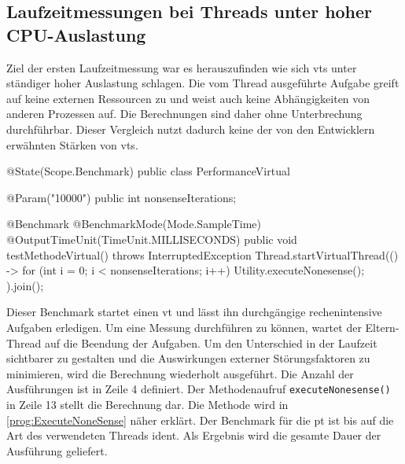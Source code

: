 \subsection{Laufzeitmessungen bei Threads unter hoher CPU-Auslastung}                                         
\label{subsec:LaufzeitmessungenbeiThreadsunterhoherAuslastung}

    Ziel der ersten Laufzeitmessung war es herauszufinden wie sich \Glspl{vt} unter ständiger hoher Auslastung schlagen. Die vom Thread ausgeführte Aufgabe greift auf keine 
    externen Ressourcen zu und weist auch keine Abhängigkeiten von anderen Prozessen auf. Die Berechnungen sind daher ohne Unterbrechung durchführbar.
    Dieser Vergleich nutzt dadurch keine der von den Entwicklern erwähnten  Stärken von \Glspl{vt}.
    \begin{program} [H]
        \caption{Benchmark eines \Glspl{vt} unter hoher Auslastung}
        \label{prog:BenchmarkEinesVTUnterHoherAuslastung}
    \begin{JavaCode}[language=Java, numbers=left]
@State(Scope.Benchmark)
public class PerformanceVirtual {

    @Param("10000")
    public int nonsenseIterations;

    @Benchmark
    @BenchmarkMode(Mode.SampleTime)
    @OutputTimeUnit(TimeUnit.MILLISECONDS)
    public void testMethodeVirtual() throws InterruptedException {
        Thread.startVirtualThread(() -> {
            for (int i = 0; i < nonsenseIterations; i++)
                Utility.executeNonesense();
        }).join();
    }
}\end{JavaCode}
    \end{program}
    Dieser Benchmark startet einen \gls{vt} und lässt ihn durchgängige rechenintensive Aufgaben erledigen. Um eine Messung durchführen zu können, wartet der Eltern-Thread auf
    die Beendung der Aufgaben. Um den Unterschied in der Laufzeit sichtbarer zu gestalten und die Auswirkungen externer Störungsfaktoren zu minimieren,
    wird die Berechnung wiederholt ausgeführt. Die Anzahl der Ausführungen ist in Zeile 4 definiert. Der Methodenaufruf \texttt{executeNonesense()} in Zeile 13 stellt die Berechnung dar.
    Die Methode wird in \ref{prog:ExecuteNoneSense} näher erklärt. Der Benchmark für die \gls{pt} ist bis auf die Art des verwendeten Threads ident.
    Als Ergebnis wird die gesamte Dauer der Ausführung geliefert. 

